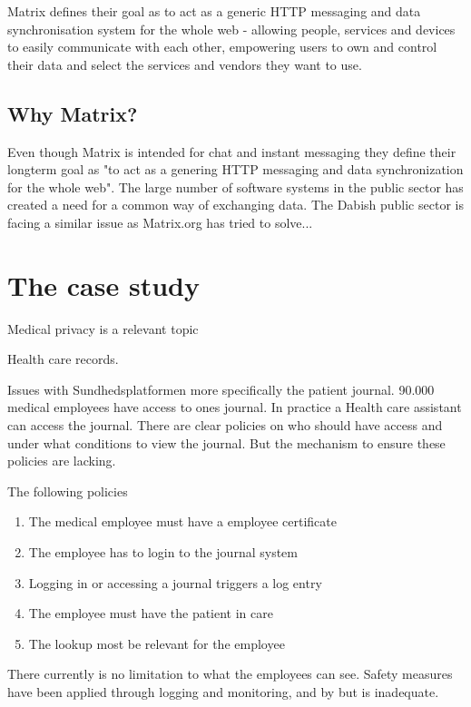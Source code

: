 Matrix defines their goal as to act as a generic HTTP messaging and data synchronisation system for the whole web - allowing people, services and devices to easily communicate with each other, empowering users to own and control their data and select the services and vendors they want to use.

\subsection{Why Matrix?}
Even though Matrix is intended for chat and instant messaging they define their longterm goal as "to act as a genering HTTP messaging and data synchronization for the whole web". 
The large number of software systems in the public sector has created a need for a common way of exchanging data. The Dabish public sector is facing a similar issue as Matrix.org has tried to solve...


\section{The case study} %

Medical privacy is a relevant topic 

Health care records. 

Issues with Sundhedsplatformen more specifically the patient journal. 90.000 medical employees have access to ones journal. In practice a Health care assistant can access the journal. There are clear policies on who should have access and under what conditions to view the journal. But the mechanism to ensure these policies are lacking. 


The following policies 
\begin{enumerate}
	\item The medical employee must have a employee certificate
	\item The employee has to login to the journal system 
	\item Logging in or accessing a journal triggers a log entry
	\item The employee must have the patient in care 
	\item The lookup most be relevant for the employee
\end{enumerate}





There currently is no limitation to what the employees can see. Safety measures have been applied through logging and monitoring, and by  but is inadequate.

